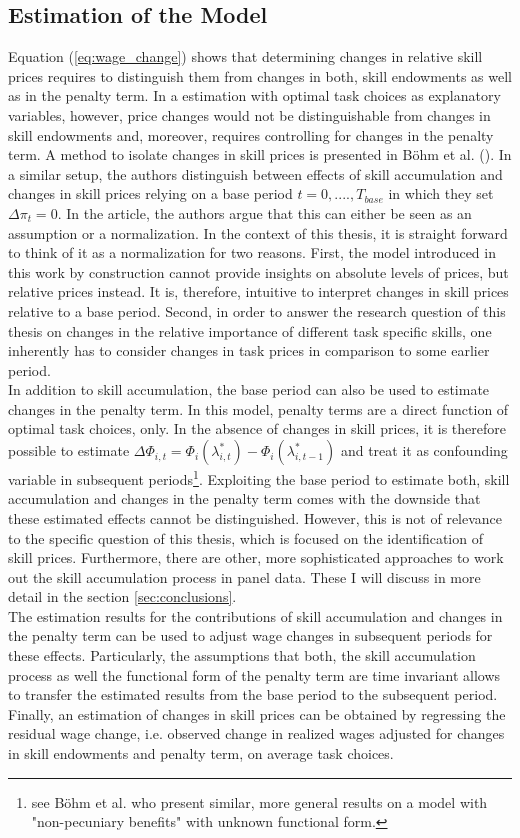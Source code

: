 \documentclass[../main.tex]{subfiles}
\begin{document}
\subsection{Estimation of the Model} \label{sec:model_estimation}
Equation (\ref{eq:wage_change}) shows that determining changes in relative skill prices requires to distinguish them from changes in both, skill endowments as well as in the penalty term. In a estimation with optimal task choices as explanatory variables, however, price changes would not be distinguishable from changes in skill endowments and, moreover, requires controlling for changes in the penalty term. A method to isolate changes in skill prices is presented in Böhm et al. (\citeyear{bohm2019occupation}). In a similar setup, the authors distinguish between effects of skill accumulation and changes in skill prices relying on a base period $t=0, ...., T_{base}$ in which they set $\Delta \pi_t = 0$. In the article, the authors argue that this can either be seen as an assumption or a normalization. In the context of this thesis, it is straight forward to think of it as a normalization for two reasons. First, the model introduced in this work by construction cannot provide insights on absolute levels of prices, but relative prices instead. It is, therefore, intuitive to interpret changes in skill prices relative to a base period. Second, in order to answer the research question of this thesis on changes in the relative importance of different task specific skills, one inherently has to consider changes in task prices in comparison to some earlier period.
\\
In addition to skill accumulation, the base period can also be used to estimate changes in the penalty term. In this model, penalty terms are a direct function of optimal task choices, only. In the absence of changes in skill prices, it is therefore possible to estimate $\Delta \Phi_{i,t} = \Phi_i(\lambda_{i,t}^*) - \Phi_i(\lambda_{i,t-1}^*)$ and treat it as confounding variable in subsequent periods\footnote{see Böhm et al. \citeyear{bohm2019occupation} who present similar, more general results on a model with "non-pecuniary benefits" with unknown functional form.}. Exploiting the base period to estimate both, skill accumulation and changes in the penalty term comes with the downside that these estimated effects cannot be distinguished. However, this is not of relevance to the specific question of this thesis, which is focused on the identification of skill prices. Furthermore, there are other, more sophisticated approaches to work out the skill accumulation process in panel data. These I will discuss in more detail in the section \ref{sec:conclusions}.
\\
The estimation results for the contributions of skill accumulation and changes in the penalty term can be used to adjust wage changes in subsequent periods for these effects. Particularly, the assumptions that both, the skill accumulation process as well the functional form of the penalty term are time invariant allows to transfer the estimated results from the base period to the subsequent period. Finally, an estimation of changes in skill prices can be obtained by regressing the residual wage change, i.e. observed change in realized wages adjusted for changes in skill endowments and penalty term, on average task choices.
\end{document}
